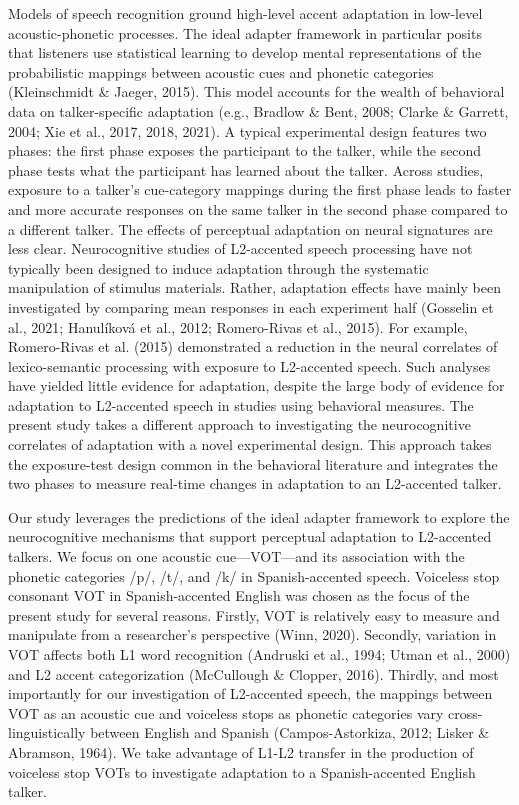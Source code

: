 \documentclass[
  12pt,
  twoside]{article}
\begin{document}
Models of speech recognition ground high-level accent adaptation in low-level acoustic-phonetic processes.
The ideal adapter framework in particular posits that listeners use statistical learning to develop mental representations of the probabilistic mappings between acoustic cues and phonetic categories (Kleinschmidt \& Jaeger, 2015).
This model accounts for the wealth of behavioral data on talker-specific adaptation (e.g., Bradlow \& Bent, 2008; Clarke \& Garrett, 2004; Xie et al., 2017, 2018, 2021).
A typical experimental design features two phases: the first phase exposes the participant to the talker, while the second phase tests what the participant has learned about the talker.
Across studies, exposure to a talker's cue-category mappings during the first phase leads to faster and more accurate responses on the same talker in the second phase compared to a different talker.
The effects of perceptual adaptation on neural signatures are less clear.
Neurocognitive studies of L2-accented speech processing have not typically been designed to induce adaptation through the systematic manipulation of stimulus materials.
Rather, adaptation effects have mainly been investigated by comparing mean responses in each experiment half (Gosselin et al., 2021; Hanulíková et al., 2012; Romero-Rivas et al., 2015).
For example, Romero-Rivas et al. (2015) demonstrated a reduction in the neural correlates of lexico-semantic processing with exposure to L2-accented speech.
Such analyses have yielded little evidence for adaptation, despite the large body of evidence for adaptation to L2-accented speech in studies using behavioral measures.
The present study takes a different approach to investigating the neurocognitive correlates of adaptation with a novel experimental design.
This approach takes the exposure-test design common in the behavioral literature and integrates the two phases to measure real-time changes in adaptation to an L2-accented talker.

Our study leverages the predictions of the ideal adapter framework to explore the neurocognitive mechanisms that support perceptual adaptation to L2-accented talkers.
We focus on one acoustic cue---VOT---and its association with the phonetic categories /p/, /t/, and /k/ in Spanish-accented speech.
Voiceless stop consonant VOT in Spanish-accented English was chosen as the focus of the present study for several reasons.
Firstly, VOT is relatively easy to measure and manipulate from a researcher's perspective (Winn, 2020).
Secondly, variation in VOT affects both L1 word recognition (Andruski et al., 1994; Utman et al., 2000) and L2 accent categorization (McCullough \& Clopper, 2016).
Thirdly, and most importantly for our investigation of L2-accented speech, the mappings between VOT as an acoustic cue and voiceless stops as phonetic categories vary cross-linguistically between English and Spanish (Campos-Astorkiza, 2012; Lisker \& Abramson, 1964).
We take advantage of L1-L2 transfer in the production of voiceless stop VOTs to investigate adaptation to a Spanish-accented English talker.
\end{document}
